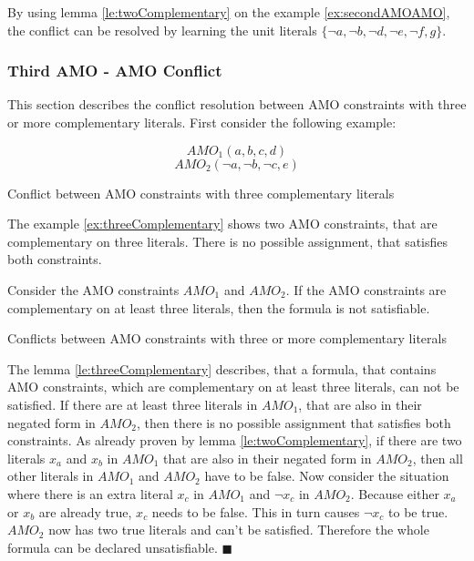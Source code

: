 By using lemma \ref{le:twoComplementary} on the example \ref{ex:secondAMOAMO}, the conflict can be resolved by learning the unit literals $\{\neg a, \neg b, \neg d, \neg e, \neg f, g\}$.


\subsubsection{Third AMO - AMO Conflict}

This section describes the conflict resolution between AMO constraints with three or more complementary literals. First consider the following example:

\begin{example}
\begin{leftbar}
\begin{displaymath}
AMO_1(a,b,c,d)
\end{displaymath}
\begin{displaymath}
AMO_2(\neg a, \neg b, \neg c, e)
\end{displaymath}
\end{leftbar}
\caption{Conflict between AMO constraints with three complementary literals}
\label{ex:threeComplementary}
\end{example}

The example \ref{ex:threeComplementary} shows two AMO constraints, that are complementary on three literals. There is no possible assignment, that satisfies both constraints.

\begin{lemma}
\begin{leftbar}
Consider the AMO constraints $AMO_1$ and $AMO_2$. If the AMO constraints are complementary on at least three literals, then the formula is not satisfiable.
\end{leftbar}
\caption{Conflicts between AMO constraints with three or more complementary literals}
\label{le:threeComplementary}
\end{lemma}

The lemma \ref{le:threeComplementary} describes, that a formula, that contains AMO constraints, which are complementary on at least three literals, can not be satisfied.
If there are at least three literals in $AMO_1$, that are also in their negated form in $AMO_2$, then there is no possible assignment that satisfies both constraints. As already proven by lemma \ref{le:twoComplementary}, if there are two literals $x_a$ and $x_b$ in $AMO_1$ that are also in their negated form in $AMO_2$, then all other literals in $AMO_1$ and $AMO_2$ have to be false. Now consider the situation where there is an extra literal $x_c$ in $AMO_1$ and $\neg x_c$ in $AMO_2$. Because either $x_a$ or $x_b$ are already true, $x_c$ needs to be false. This in turn causes $\neg x_c$ to be true. $AMO_2$ now has two true literals and can't be satisfied. Therefore the whole formula can be declared unsatisfiable. $\blacksquare$

